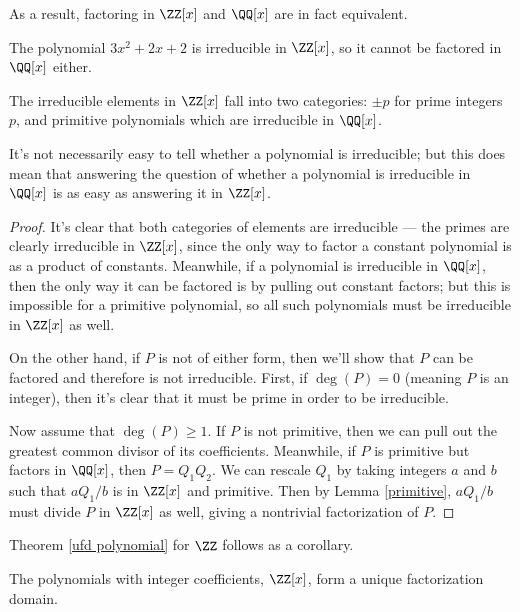 As a result, factoring in $\ZZ[x]$ and $\QQ[x]$ are in fact equivalent.

\begin{example}
    The polynomial $3x^2 + 2x + 2$ is irreducible in $\ZZ[x]$, so it cannot be factored in $\QQ[x]$ either. 
\end{example}

\begin{corollary}
The irreducible elements in $\ZZ[x]$ fall into two categories: $\pm p$ for prime integers $p$, and primitive polynomials which are irreducible in $\QQ[x]$. 
\end{corollary}

It's not necessarily easy to tell whether a polynomial is irreducible; but this does mean that answering the question of whether a polynomial is irreducible in $\QQ[x]$ is as easy as answering it in $\ZZ[x]$. 

\begin{proof}
It's clear that both categories of elements are irreducible --- the primes are clearly irreducible in $\ZZ[x]$, since the only way to factor a constant polynomial is as a product of constants. Meanwhile, if a polynomial is irreducible in $\QQ[x]$, then the only way it can be factored is by pulling out constant factors; but this is impossible for a primitive polynomial, so all such polynomials must be irreducible in $\ZZ[x]$ as well.  

On the other hand, if $P$ is not of either form, then we'll show that $P$ can be factored and therefore is not irreducible. First, if $\deg(P) = 0$ (meaning $P$ is an integer), then it's clear that it must be prime in order to be irreducible. 

Now assume that $\deg(P) \geq 1$. If $P$ is not primitive, then we can pull out the greatest common divisor of its coefficients. Meanwhile, if $P$ is primitive but factors in $\QQ[x]$, then $P = Q_1Q_2$. We can rescale $Q_1$ by taking integers $a$ and $b$ such that $aQ_1/b$ is in $\ZZ[x]$ and primitive. Then by Lemma \ref{primitive}, $aQ_1/b$ must divide $P$ in $\ZZ[x]$ as well, giving a nontrivial factorization of $P$. 
\end{proof}

Theorem \ref{ufd polynomial} for $\ZZ$ follows as a corollary.

\begin{corollary}
The polynomials with integer coefficients, $\ZZ[x]$, form a unique factorization domain.
\end{corollary}

